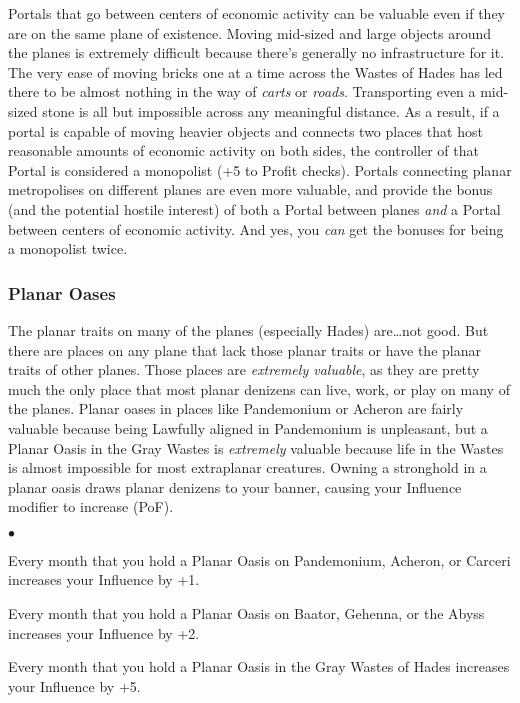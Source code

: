 Portals that go between centers of economic activity can be valuable even if they are on the same plane of existence. Moving mid-sized and large objects around the planes is extremely difficult because there's generally no infrastructure for it. The very ease of moving bricks one at a time across the Wastes of Hades has led there to be almost nothing in the way of \textit{carts} or \textit{roads}. Transporting even a mid-sized stone is all but impossible across any meaningful distance. As a result, if a portal is capable of moving heavier objects and connects two places that host reasonable amounts of economic activity on both sides, the controller of that Portal is considered a monopolist (+5 to Profit checks). Portals connecting planar metropolises on different planes are even more valuable, and provide the bonus (and the potential hostile interest) of both a Portal between planes \textit{and} a Portal between centers of economic activity. And yes, you \textit{can} get the bonuses for being a monopolist twice.

\subsubsection{Planar Oases}

The planar traits on many of the planes (especially Hades) are\ldots not good. But there are places on any plane that lack those planar traits or have the planar traits of other planes. Those places are \textit{extremely valuable}, as they are pretty much the only place that most planar denizens can live, work, or play on many of the planes. Planar oases in places like Pandemonium or Acheron are fairly valuable because being Lawfully aligned in Pandemonium is unpleasant, but a Planar Oasis in the Gray Wastes is \textit{extremely} valuable because life in the Wastes is almost impossible for most extraplanar creatures. Owning a stronghold in a planar oasis draws planar denizens to your banner, causing your Influence modifier to increase (PoF).

\begin{list}{$\bullet$}{\itemspace}
	\item Every month that you hold a Planar Oasis on Pandemonium, Acheron, or Carceri increases your Influence by +1.
	\item Every month that you hold a Planar Oasis on Baator, Gehenna, or the Abyss increases your Influence by +2.
	\item Every month that you hold a Planar Oasis in the Gray Wastes of Hades increases your Influence by +5.
\end{list}

